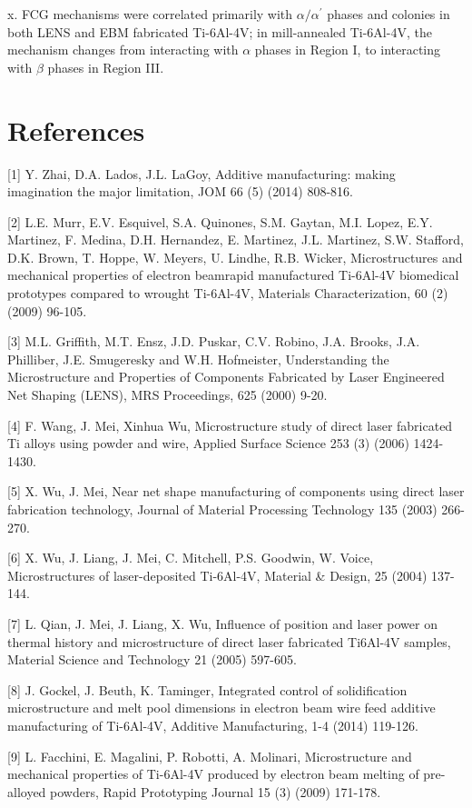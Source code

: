 \documentclass[10pt]{article}
\begin{document}
x. FCG mechanisms were correlated primarily with $\alpha / \alpha^{\prime}$ phases and colonies in both LENS and EBM fabricated Ti-6Al-4V; in mill-annealed Ti-6Al-4V, the mechanism changes from interacting with $\alpha$ phases in Region I, to interacting with $\beta$ phases in Region III.

\section*{References}
[1] Y. Zhai, D.A. Lados, J.L. LaGoy, Additive manufacturing: making imagination the major limitation, JOM 66 (5) (2014) 808-816.

[2] L.E. Murr, E.V. Esquivel, S.A. Quinones, S.M. Gaytan, M.I. Lopez, E.Y. Martinez, F. Medina, D.H. Hernandez, E. Martinez, J.L. Martinez, S.W. Stafford, D.K. Brown, T. Hoppe, W. Meyers, U. Lindhe, R.B. Wicker, Microstructures and mechanical properties of electron beamrapid manufactured Ti-6Al-4V biomedical prototypes compared to wrought Ti-6Al-4V, Materials Characterization, 60 (2) (2009) 96-105.

[3] M.L. Griffith, M.T. Ensz, J.D. Puskar, C.V. Robino, J.A. Brooks, J.A. Philliber, J.E. Smugeresky and W.H. Hofmeister, Understanding the Microstructure and Properties of Components Fabricated by Laser Engineered Net Shaping (LENS), MRS Proceedings, 625 (2000) 9-20.

[4] F. Wang, J. Mei, Xinhua Wu, Microstructure study of direct laser fabricated Ti alloys using powder and wire, Applied Surface Science 253 (3) (2006) 1424-1430.

[5] X. Wu, J. Mei, Near net shape manufacturing of components using direct laser fabrication technology, Journal of Material Processing Technology 135 (2003) 266-270.

[6] X. Wu, J. Liang, J. Mei, C. Mitchell, P.S. Goodwin, W. Voice, Microstructures of laser-deposited Ti-6Al-4V, Material \& Design, 25 (2004) 137-144.

[7] L. Qian, J. Mei, J. Liang, X. Wu, Influence of position and laser power on thermal history and microstructure of direct laser fabricated Ti6Al-4V samples, Material Science and Technology 21 (2005) 597-605.

[8] J. Gockel, J. Beuth, K. Taminger, Integrated control of solidification microstructure and melt pool dimensions in electron beam wire feed additive manufacturing of Ti-6Al-4V, Additive Manufacturing, 1-4 (2014) 119-126.

[9] L. Facchini, E. Magalini, P. Robotti, A. Molinari, Microstructure and mechanical properties of Ti-6Al-4V produced by electron beam melting of pre-alloyed powders, Rapid Prototyping Journal 15 (3) (2009) 171-178.
\end{document}
